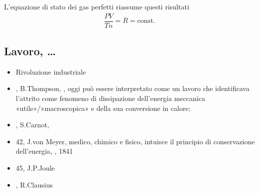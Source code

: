 \documentclass[letterpaper,10pt,italian]{jupyterBook}
\begin{document}
\sphinxAtStartPar
L’equazione di stato dei gas perfetti riassume questi risultati
\begin{equation*}
\begin{split}\dfrac{P V}{T n} = R = \text{const.}\end{split}
\end{equation*}

\subsection{Lavoro, … }
\label{\detokenize{ch/thermodynamics/foundation-experiments:lavoro-todo}}

\begin{itemize}
\item {} 
\sphinxAtStartPar
Rivoluzione industriale

\item {} 
, B.Thompson, , oggi può essere interpretato come un lavoro che identificava l’attrito come fenomeno di dissipazione dell’energia meccanica «utile»/»macroscopica» e della sua conversione in calore;

\item {} 
, S.Carnot, 

\item {} 
\sphinxhyphen{}42, J.von Meyer, medico, chimico e fisico, intuisce il principio di conservazione dell’energia,   , 1841

\item {} 
\sphinxhyphen{}45, J.P.Joule 

\item {} 
, R.Clausius

\end{itemize}
\end{document}
